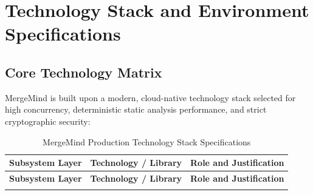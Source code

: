 \chapter{Technology Stack and Environment Specifications}
\label{app:tech-stack}

\section{Core Technology Matrix}

MergeMind is built upon a modern, cloud-native technology stack selected for high concurrency, deterministic static analysis performance, and strict cryptographic security:

\begin{longtable}{p{} p{} p{}}
\caption{MergeMind Production Technology Stack Specifications} \label{tab:app-tech-stack} \\
\toprule
\textbf{Subsystem Layer} & \textbf{Technology / Library} & \textbf{Role and Justification} \\
\midrule
\endfirsthead
\toprule
\textbf{Subsystem Layer} & \textbf{Technology / Library} & \textbf{Role and Justification} \\
\midrule
\endhead
\bottomrule
\endfoot
\bottomrule
\endlastfoot


\end{longtable}

